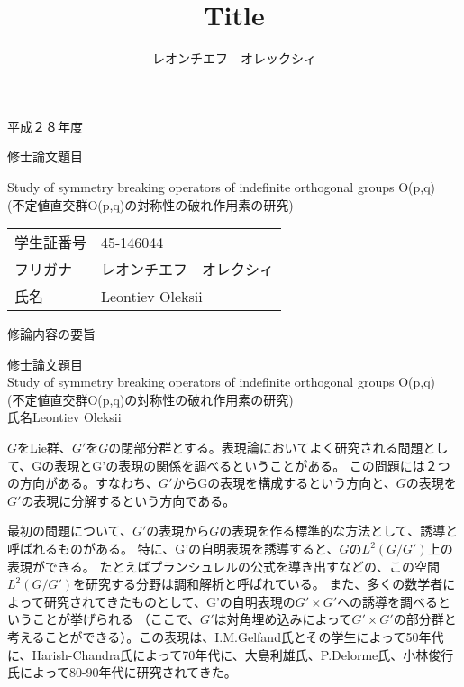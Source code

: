 \documentclass[a4paper]{article} %
\title{Title}
\author{レオンチエフ　オレックシィ}
\begin{document}
\begin{titlepage}
{\huge\begin{spacing}{1.2}
\begin{center}
	平成２８年度
	\end{center}
	\vspace{2cm}
	修士論文題目
	\begin{center}
	{\Huge Study of symmetry breaking operators of indefinite orthogonal groups O(p,q)}\\
	(不定値直交群O(p,q)の対称性の破れ作用素の研究)\\
\vspace{6cm}
\begin{tabular}{ll}
学生証番号&45-146044\\
フリガナ & レオンチエフ　オレクシィ\\
氏名&Leontiev Oleksii
\end{tabular}
	\end{center}
\end{spacing}
}
\end{titlepage}
\begin{spacing}{1.5}
\begin{center} 修論内容の要旨\end{center}
\noindent 修士論文題目\\ 
Study of symmetry breaking operators of indefinite orthogonal groups O(p,q)\\
(不定値直交群O(p,q)の対称性の破れ作用素の研究)\\
氏名\quad Leontiev Oleksii
\end{spacing}\vspace{0.5cm}

$G$をLie群、$G'$を$G$の閉部分群とする。表現論においてよく研究される問題として、Gの表現とG’の表現の関係を調べるということがある。
この問題には２つの方向がある。すなわち、$G'$からGの表現を構成するという方向と、$G$の表現を$G'$の表現に分解するという方向である。\par
最初の問題について、$G'$の表現から$G$の表現を作る標準的な方法として、誘導と呼ばれるものがある。
特に、G’の自明表現を誘導すると、$G$の$L^2(G/G')$上の表現ができる。
たとえばプランシュレルの公式を導き出すなどの、この空間$L^2(G/G')$を研究する分野は調和解析と呼ばれている。
また、多くの数学者によって研究されてきたものとして、G’の自明表現の$G'\times G'$への誘導を調べるということが挙げられる
（ここで、$G'$は対角埋め込みによって$G'\times G'$の部分群と考えることができる）。この表現は、I.M.Gelfand氏とその学生によって50年代に、Harish-Chandra氏によって70年代に、大島利雄氏、P.Delorme氏、小林俊行氏によって80-90年代に研究されてきた。
\end{document}

